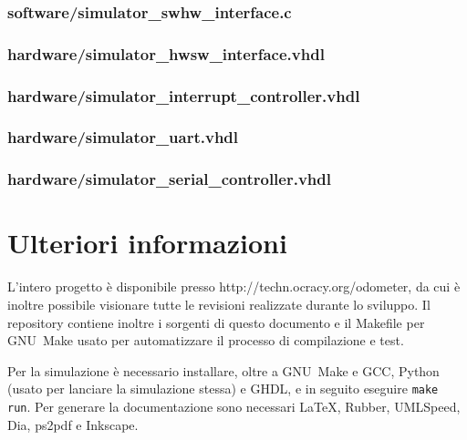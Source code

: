 \documentclass [11pt,a4paper,oneside]{paper}
\newcommand{\href}[2]{#2}
\newcommand{\link}[1]{\href{#1}{#1}}
\newcommand{\inputVHDL}[1]{}
\newcommand{\inputC}[1]{}
\begin{document}
\subsubsection{software/simulator\_swhw\_interface.c}
\inputC{software/simulator_swhw_interface.c}

\subsubsection{hardware/simulator\_hwsw\_interface.vhdl}
\inputVHDL{hardware/simulator_hwsw_interface.vhdl}

\subsubsection{hardware/simulator\_interrupt\_controller.vhdl}
\inputVHDL{hardware/simulator_interrupt_controller.vhdl}

\subsubsection{hardware/simulator\_uart.vhdl}
\inputVHDL{hardware/simulator_uart.vhdl}

\subsubsection{hardware/simulator\_serial\_controller.vhdl}
\inputVHDL{hardware/simulator_serial_controller.vhdl}


\section{Ulteriori informazioni}
L'intero progetto è disponibile presso \link{http://techn.ocracy.org/odometer}, da cui
è inoltre possibile visionare tutte le revisioni realizzate durante lo sviluppo.
Il repository contiene inoltre i sorgenti di questo documento e il Makefile
per GNU~Make usato per automatizzare il processo di compilazione e test.

Per la simulazione è necessario installare, oltre a GNU~Make e GCC, Python
(usato per lanciare la simulazione stessa) e GHDL, e in seguito eseguire
\texttt{make run}. Per generare la documentazione sono necessari \LaTeX,
Rubber, UMLSpeed, Dia, ps2pdf e Inkscape.
\end{document}
